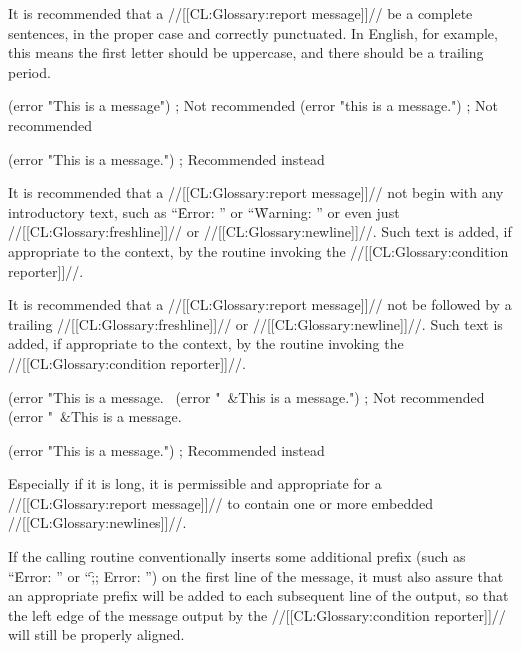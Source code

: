 
It is recommended that a //[[CL:Glossary:report message]]// be a complete sentences, in the proper case and correctly punctuated.  In English, for example, this means the first letter should be uppercase, and there should be a trailing period.

\code
 (error "This is a message")  ; Not recommended
 (error "this is a message.") ; Not recommended

 (error "This is a message.") ; Recommended instead \endcode

\endsubsubsubsection%


It is recommended that a //[[CL:Glossary:report message]]// not begin with any  introductory text, such as ``\f{Error: }'' or ``\f{Warning: }'' or even just //[[CL:Glossary:freshline]]// or //[[CL:Glossary:newline]]//.  Such text is added, if appropriate to the context, by the routine invoking the //[[CL:Glossary:condition reporter]]//.

It is recommended that a //[[CL:Glossary:report message]]// not be followed  by a trailing //[[CL:Glossary:freshline]]// or //[[CL:Glossary:newline]]//. Such text is added, if appropriate to the context,  by the routine invoking the //[[CL:Glossary:condition reporter]]//.

\code
 (error "This is a message.~%
 (error "~&This is a message.")   ; Not recommended
 (error "~&This is a message.~%

 (error "This is a message.")     ; Recommended instead \endcode

\endsubsubsubsection%


Especially if it is long, it is permissible and appropriate for  a //[[CL:Glossary:report message]]// to contain one or more embedded //[[CL:Glossary:newlines]]//.

If the calling routine conventionally inserts some additional prefix (such as ``\f{Error: }'' or ``\f{;; Error: }'') on the first line of the message, it must also assure that an appropriate prefix will be added to each subsequent line of the output, so that the left edge of the message output by the //[[CL:Glossary:condition reporter]]// will still be properly aligned.

